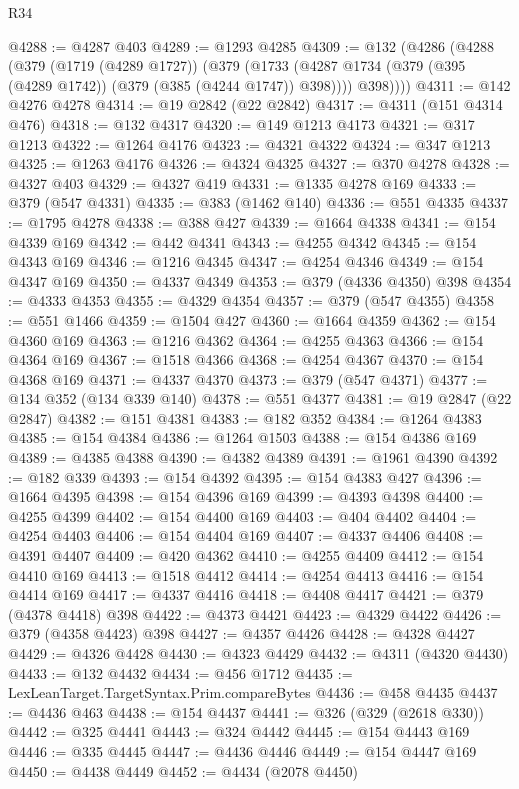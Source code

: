 \begin{lexlean}{R34}
\begin{coremodule}
@4288 := @4287 @403
@4289 := @1293 @4285
@4309 := @132
    (@4286
      (@4288
        (@379
          (@1719 (@4289 @1727))
          (@379
            (@1733 (@4287 @1734 (@379 (@395 (@4289 @1742)) (@379 (@385 (@4244 @1747)) @398))))
            @398))))
@4311 := @142 @4276 @4278
@4314 := @19 @2842 (@22 @2842)
@4317 := @4311 (@151 @4314 @476)
@4318 := @132 @4317
@4320 := @149 @1213 @4173
@4321 := @317 @1213
@4322 := @1264 @4176
@4323 := @4321 @4322
@4324 := @347 @1213
@4325 := @1263 @4176
@4326 := @4324 @4325
@4327 := @370 @4278
@4328 := @4327 @403
@4329 := @4327 @419
@4331 := @1335 @4278 @169
@4333 := @379 (@547 @4331)
@4335 := @383 (@1462 @140)
@4336 := @551 @4335
@4337 := @1795 @4278
@4338 := @388 @427
@4339 := @1664 @4338
@4341 := @154 @4339 @169
@4342 := @442 @4341
@4343 := @4255 @4342
@4345 := @154 @4343 @169
@4346 := @1216 @4345
@4347 := @4254 @4346
@4349 := @154 @4347 @169
@4350 := @4337 @4349
@4353 := @379 (@4336 @4350) @398
@4354 := @4333 @4353
@4355 := @4329 @4354
@4357 := @379 (@547 @4355)
@4358 := @551 @1466
@4359 := @1504 @427
@4360 := @1664 @4359
@4362 := @154 @4360 @169
@4363 := @1216 @4362
@4364 := @4255 @4363
@4366 := @154 @4364 @169
@4367 := @1518 @4366
@4368 := @4254 @4367
@4370 := @154 @4368 @169
@4371 := @4337 @4370
@4373 := @379 (@547 @4371)
@4377 := @134 @352 (@134 @339 @140)
@4378 := @551 @4377
@4381 := @19 @2847 (@22 @2847)
@4382 := @151 @4381
@4383 := @182 @352
@4384 := @1264 @4383
@4385 := @154 @4384
@4386 := @1264 @1503
@4388 := @154 @4386 @169
@4389 := @4385 @4388
@4390 := @4382 @4389
@4391 := @1961 @4390
@4392 := @182 @339
@4393 := @154 @4392
@4395 := @154 @4383 @427
@4396 := @1664 @4395
@4398 := @154 @4396 @169
@4399 := @4393 @4398
@4400 := @4255 @4399
@4402 := @154 @4400 @169
@4403 := @404 @4402
@4404 := @4254 @4403
@4406 := @154 @4404 @169
@4407 := @4337 @4406
@4408 := @4391 @4407
@4409 := @420 @4362
@4410 := @4255 @4409
@4412 := @154 @4410 @169
@4413 := @1518 @4412
@4414 := @4254 @4413
@4416 := @154 @4414 @169
@4417 := @4337 @4416
@4418 := @4408 @4417
@4421 := @379 (@4378 @4418) @398
@4422 := @4373 @4421
@4423 := @4329 @4422
@4426 := @379 (@4358 @4423) @398
@4427 := @4357 @4426
@4428 := @4328 @4427
@4429 := @4326 @4428
@4430 := @4323 @4429
@4432 := @4311 (@4320 @4430)
@4433 := @132 @4432
@4434 := @456 @1712
@4435 := LexLeanTarget.TargetSyntax.Prim.compareBytes
@4436 := @458 @4435
@4437 := @4436 @463
@4438 := @154 @4437
@4441 := @326 (@329 (@2618 @330))
@4442 := @325 @4441
@4443 := @324 @4442
@4445 := @154 @4443 @169
@4446 := @335 @4445
@4447 := @4436 @4446
@4449 := @154 @4447 @169
@4450 := @4438 @4449
@4452 := @4434 (@2078 @4450)

\end{coremodule}
\end{lexlean}
